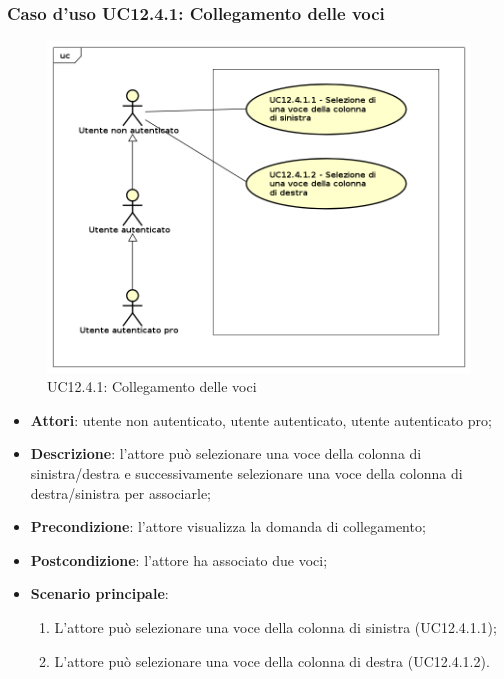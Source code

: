 \subsubsection{Caso d'uso UC12.4.1: Collegamento delle voci}
\label{UC12.4.1}
\begin{figure}[h]
	\centering
	\includegraphics[scale=0.5]{UML/UC12_4_1.png}
	\caption{UC12.4.1: Collegamento delle voci}
\end{figure}
\begin{itemize}
\item \textbf{Attori}: utente non autenticato, utente autenticato, utente autenticato pro;
\item \textbf{Descrizione}: l'attore può selezionare una voce della colonna di sinistra/destra e successivamente selezionare una voce della colonna di destra/sinistra per associarle;
\item \textbf{Precondizione}: l'attore visualizza la domanda di collegamento;
\item \textbf{Postcondizione}: l'attore ha associato due voci;
\item \textbf{Scenario principale}:
\begin{enumerate}
\item L'attore può selezionare una voce della colonna di sinistra (UC12.4.1.1);
\item L'attore può selezionare una voce della colonna di destra (UC12.4.1.2).
\end{enumerate}
\end{itemize}

